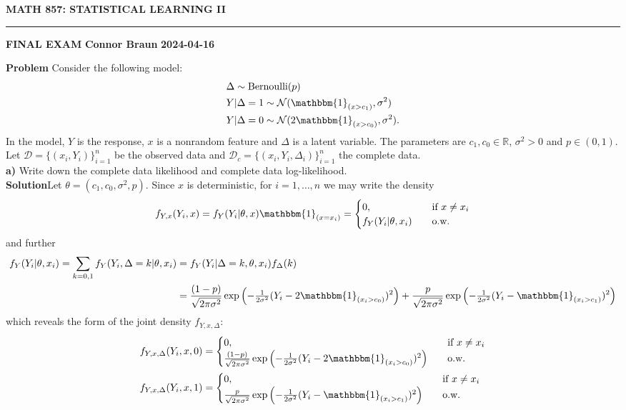 \documentclass[10pt]{article}
\newcommand{\bp}[1]{\left({#1}\right)}
\newcommand{\mbb}[1]{\mathbb{#1}}
\newcommand{\1}[1]{\mathbbm{1}_{#1}}
\newcommand{\mc}[1]{\mathcal{#1}}
\begin{document}
    \begin{center}
        {\bf\large{MATH 857: STATISTICAL LEARNING II}}
        \smallskip
        \hrule
        \smallskip
        {\bf FINAL EXAM} \hfill {\bf Connor Braun} \hfill {\bf 2024-04-16}
    \end{center}
{\bf Problem}\hspace{5pt} Consider the following model:
\begin{align*}
    &\Delta\sim\text{Bernoulli}(p)\\
    &Y|\Delta=1\sim\mc{N}(\mathbbm{1}_{(x>c_1)},\sigma^2)\\
    &Y|\Delta=0\sim\mc{N}(2\mathbbm{1}_{(x>c_0)}, \sigma^2).
\end{align*}
In the model, $Y$ is the response, $x$ is a nonrandom feature and $\Delta$ is a latent variable. The parameters are
$c_1,c_0\in\mbb{R}$, $\sigma^2>0$ and $p\in(0,1)$.
Let $\mc{D}=\{(x_i,Y_i)\}_{i=1}^n$ be the observed data and $\mc{D}_c=\{(x_i,Y_i,\Delta_i)\}_{i=1}^n$ the complete data.\\[5pt]
{\bf a)}\hspace{5pt} Write down the complete data likelihood and complete data log-likelihood.\\[5pt]
{\bf Solution}\hspace{5pt}Let $\theta=(c_1,c_0,\sigma^2,p)$. Since $x$ is deterministic, for $i=1,\dots, n$ we may write the density
\begin{align*}
    f_{Y,x}(Y_i,x)=f_Y(Y_i|\theta, x)\mathbbm{1}_{(x=x_i)}=\begin{cases}
        0,\quad&\text{if $x\neq x_i$}\\
        f_Y(Y_i|\theta,x_i)\quad&\text{o.w.}
    \end{cases}
\end{align*}
and further
\begin{align*}
    f_Y(Y_i|\theta,x_i)=\sum_{k=0,1}f_Y(Y_i,\Delta=k|\theta,x_i)&=f_Y(Y_i|\Delta=k,\theta,x_i)f_\Delta(k)\\
    &=\frac{(1-p)}{\sqrt{2\pi\sigma^2}}\exp\bp{-\tfrac{1}{2\sigma^2}(Y_i-2\mathbbm{1}_{(x_i>c_0)})^2}+\frac{p}{\sqrt{2\pi\sigma^2}}\exp\bp{-\tfrac{1}{2\sigma^2}(Y_i-\mathbbm{1}_{(x_i>c_1)})^2}
\end{align*}
which reveals the form of the joint density $f_{Y,x,\Delta}$:
\begin{align*}
    f_{Y,x,\Delta}(Y_i,x,0)&=\begin{cases}
        0,\quad&\text{if $x\neq x_i$}\\
        \frac{(1-p)}{\sqrt{2\pi\sigma^2}}\exp\bp{-\tfrac{1}{2\sigma^2}(Y_i-2\mathbbm{1}_{(x_i>c_0)})^2}\quad&\text{o.w.}
    \end{cases}\\
    f_{Y,x,\Delta}(Y_i,x,1)&=\begin{cases}
        0,\quad&\text{if $x\neq x_i$}\\
        \frac{p}{\sqrt{2\pi\sigma^2}}\exp\bp{-\tfrac{1}{2\sigma^2}(Y_i-\mathbbm{1}_{(x_i>c_1)})^2}\quad&\text{o.w.}
    \end{cases}
\end{align*}
\end{document}
